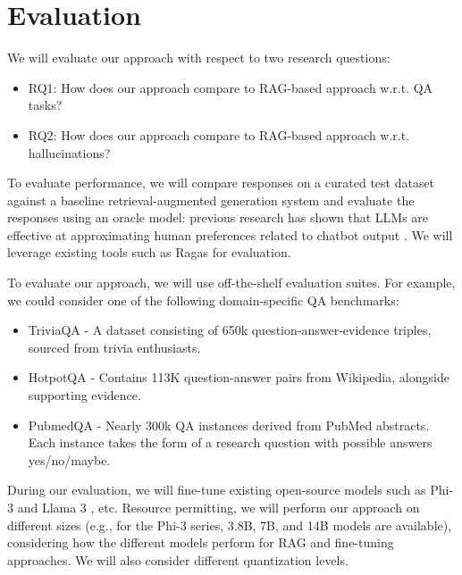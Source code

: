 \section{Evaluation}
We will evaluate our approach with respect to two research questions:

\begin{itemize}
\item RQ1: How does our approach compare to RAG-based approach w.r.t. QA tasks?
\item RQ2: How does our approach compare to RAG-based approach w.r.t. hallucinations?
\end{itemize}

To evaluate performance, we will compare responses on a curated test dataset
against a baseline retrieval-augmented generation system and evaluate the
responses using an oracle model: previous research has shown that LLMs are
effective at approximating human preferences related to chatbot output
\citep{zheng_judging_2023}. We will leverage existing tools such as Ragas
\citep{ragas} for evaluation.

To evaluate our approach, we will use off-the-shelf evaluation suites. For example, we could consider one of the following domain-specific QA benchmarks:

\begin{itemize}
\item TriviaQA \citep{joshi_triviaqa_2017} - A dataset consisting of 650k question-answer-evidence triples, sourced from trivia enthusiasts.
\item HotpotQA \citep{yang_hotpotqa_2018} - Contains 113K question-answer pairs from Wikipedia, alongside supporting evidence.
\item PubmedQA \citep{jin_pubmedqa_2019} - Nearly 300k QA instances derived from PubMed abstracts. Each instance takes the form of a research question with possible answers yes/no/maybe.
\end{itemize}

During our evaluation, we will fine-tune existing open-source models such as
Phi-3 \citep{abdin_phi-3_2024} and Llama 3 \citep{dubey_llama_2024}, etc. Resource permitting,
we will perform our approach on different sizes (e.g., for the Phi-3 series, 3.8B,
7B, and 14B models are available), considering how the different models perform
for RAG and fine-tuning approaches. We will also consider different quantization
levels.
